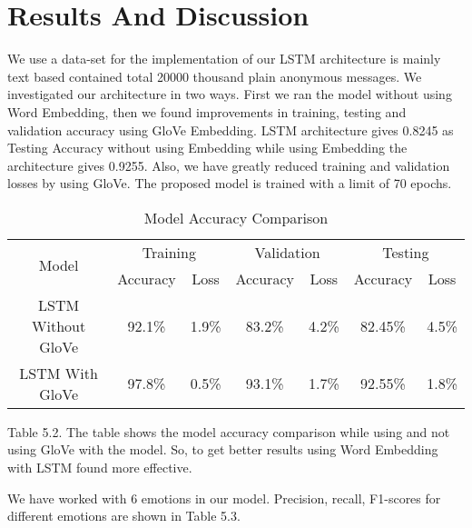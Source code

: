 \section{Results And Discussion}
We use a data-set for the implementation of our LSTM architecture is mainly text based contained total 20000 thousand plain anonymous messages. We investigated our architecture in two ways. First we ran the model without using Word Embedding, then we found improvements in training, testing and validation accuracy using GloVe Embedding. LSTM architecture gives 0.8245 as Testing Accuracy without using Embedding while using Embedding the architecture gives 0.9255. Also, we have greatly reduced training and validation losses by using GloVe. The proposed model is trained with a limit of 70 epochs.

\begin{table}[h!]
\centering
\begin{tabular}{|c|cc|cc|cc|}
\hline
\multirow{2}{*}{Model} & \multicolumn{2}{c|}{Training}         & \multicolumn{2}{c|}{Validation}       & \multicolumn{2}{c|}{Testing}          \\ \cline{2-7} 
                       & \multicolumn{1}{c|}{Accuracy} & Loss  & \multicolumn{1}{c|}{Accuracy} & Loss  & \multicolumn{1}{c|}{Accuracy} & Loss  \\ \hline
LSTM Without GloVe     & \multicolumn{1}{c|}{92.1\%}   & 1.9\% & \multicolumn{1}{c|}{83.2\%}   & 4.2\% & \multicolumn{1}{c|}{82.45\%}  & 4.5\% \\ \hline
LSTM With GloVe        & \multicolumn{1}{c|}{97.8\%}   & 0.5\% & \multicolumn{1}{c|}{93.1\%}   & 1.7\% & \multicolumn{1}{c|}{92.55\%}  & 1.8\% \\ \hline
\end{tabular}
\caption{Model Accuracy Comparison}
\end{table}

Table 5.2. The table shows the model accuracy comparison while using and not using GloVe with the model. So, to get better results using Word Embedding with LSTM found more effective.

We have worked with 6 emotions in our model. Precision, recall, F1-scores for different emotions are shown in Table 5.3.


\pagebreak

